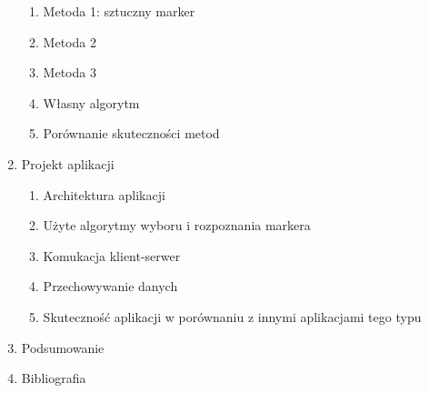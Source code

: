 \begin{enumerate}
  \begin{enumerate}
   \item Metoda 1: sztuczny marker
   \item Metoda 2
   \item Metoda 3
   \item Własny algorytm
   \item Porównanie skuteczności metod
  \end{enumerate}
 \item Projekt aplikacji
  \begin{enumerate}
   \item Architektura aplikacji
   \item Użyte algorytmy wyboru i rozpoznania markera
   \item Komukacja klient-serwer
   \item Przechowywanie danych
   \item Skuteczność aplikacji w porównaniu z innymi aplikacjami tego typu
  \end{enumerate}
 \item Podsumowanie
 \item Bibliografia
\end{enumerate}
